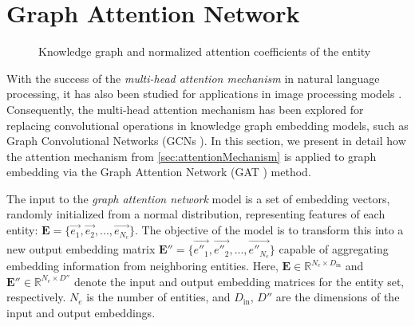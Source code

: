 

\section{Graph Attention Network}
\label{sec:GAT}

\begin{figure}[htp]
	\centering
	\caption{Knowledge graph and normalized attention coefficients of the entity}
	\label{fig:graphExample}
\end{figure}

With the success of the \textit{multi-head attention mechanism} in natural language processing, it has also been studied for applications in image processing models \cite{ramachandran2019stand}. Consequently, the multi-head attention mechanism has been explored for replacing convolutional operations in knowledge graph embedding models, such as Graph Convolutional Networks (GCNs \cite{kipf2016semi}). In this section, we present in detail how the attention mechanism from \ref{sec:attentionMechanism} is applied to graph embedding via the Graph Attention Network (GAT \cite{velivckovic2017graph}) method.

The input to the \textit{graph attention network} model is a set of embedding vectors, randomly initialized from a normal distribution, representing features of each entity: $\mathbf{E} = \Big\{\overrightarrow{e_1}, \overrightarrow{e_2}, ...,  \overrightarrow{e_{N_e}}\Big\}$. The objective of the model is to transform this into a new output embedding matrix $\mathbf{E}'' = \Big\{\overrightarrow{e''_1}, \overrightarrow{e''_2}, ...,  \overrightarrow{e''_{N_e}}\Big\}$ capable of aggregating embedding information from neighboring entities. Here, $\mathbf{E} \in \mathbb{R}^{N_e \times D_{\text{in}}}$ and $\mathbf{E}'' \in \mathbb{R}^{N_e \times D''}$ denote the input and output embedding matrices for the entity set, respectively. $N_e$ is the number of entities, and $D_{\text{in}}$, $D''$ are the dimensions of the input and output embeddings.

